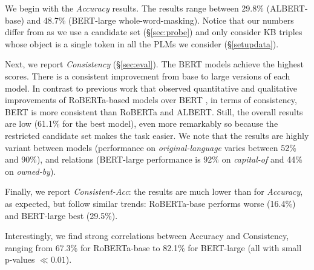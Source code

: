 We begin with the \textit{Accuracy} results. 
The results range between 29.8\% (ALBERT-base) and 48.7\% (BERT-large whole-word-masking).
Notice that our numbers differ from \citet{lama} as we use a
candidate set (\S\ref{sec:probe}) and only consider KB
triples whose object is a single token in all the PLMs we consider (\S\ref{setupdata}). 

Next, we report  \textit{Consistency}  (\S\ref{sec:eval}).
The BERT models achieve the highest scores. There is a consistent improvement from  {base} to {large} versions of each model.
In contrast to previous work that observed quantitative and qualitative improvements of RoBERTa-based models over BERT \cite{roberta,talmor2019olmpics}, in terms of consistency, BERT is more consistent than RoBERTa and ALBERT.
Still, the overall results are low (61.1\% for
the best model), %
even more remarkably so because the restricted candidate set
makes the task easier.
We note that the results are highly variant between models
 (performance on \textit{original-language} varies between
52\% and 90\%), and relations (BERT-large performance is
92\% on \textit{capital-of} and 44\% on \textit{owned-by}).

Finally, we report
\emph{Consistent-Acc}:
the results are much lower than for \textit{Accuracy}, as expected,
but follow similar trends: RoBERTa-base performs worse (16.4\%) and BERT-large best  (29.5\%).

Interestingly, we find strong correlations between Accuracy
and Consistency, ranging from 67.3\% for RoBERTa-base to
82.1\% for BERT-large (all with small p-values $\ll 0.01 $).




